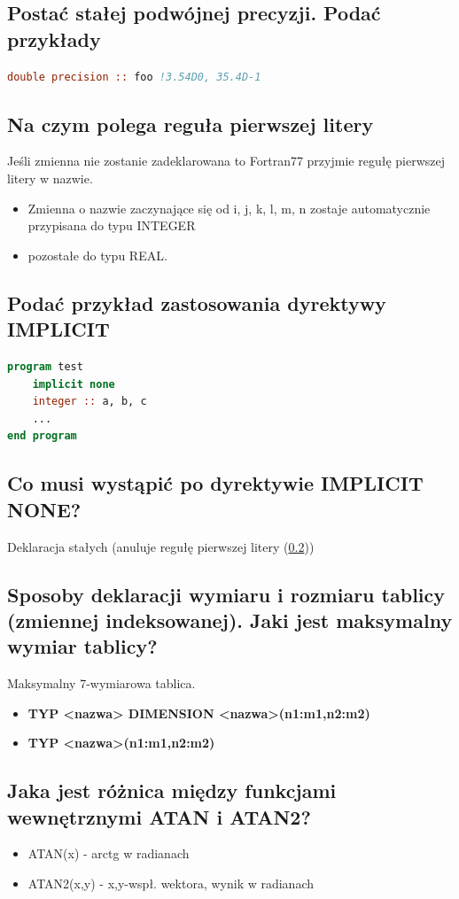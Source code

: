 \subsection{Postać stałej podwójnej precyzji. Podać przykłady}
\begin{lstlisting}[language=Fortran, caption=dyrektywa implicit]
double precision :: foo !3.54D0, 35.4D-1
\end{lstlisting}

\subsection{Na czym polega reguła pierwszej litery}
\label{sec:lit}
Jeśli zmienna nie zostanie zadeklarowana to Fortran77 przyjmie
regułę pierwszej litery w nazwie.
\begin{itemize}
\item Zmienna o nazwie zaczynające się od i, j, k, l, m, n zostaje
automatycznie przypisana do typu INTEGER
\item pozostałe do typu REAL.
\end{itemize}

\subsection{Podać przykład zastosowania dyrektywy IMPLICIT}
\begin{lstlisting}[language=Fortran, caption=dyrektywa implicit]
program test
	implicit none
	integer :: a, b, c
	...
end program
\end{lstlisting}
\subsection{Co musi wystąpić po dyrektywie IMPLICIT NONE?}
Deklaracja stałych (anuluje regułę pierwszej litery (\ref{sec:lit}))
\subsection{Sposoby deklaracji wymiaru i rozmiaru tablicy (zmiennej indeksowanej). Jaki jest maksymalny wymiar tablicy?}
Maksymalny 7-wymiarowa tablica.\\
\begin{itemize}
\item \textbf{TYP <nazwa> DIMENSION <nazwa>(n1:m1,n2:m2)}
\item \textbf{TYP <nazwa>(n1:m1,n2:m2)}
\end{itemize}


\subsection{Jaka jest różnica między funkcjami wewnętrznymi ATAN i ATAN2?}
\begin{itemize}
\item ATAN(x) - arctg w radianach
\item ATAN2(x,y) - x,y-wspł. wektora, wynik w radianach
\end{itemize}
